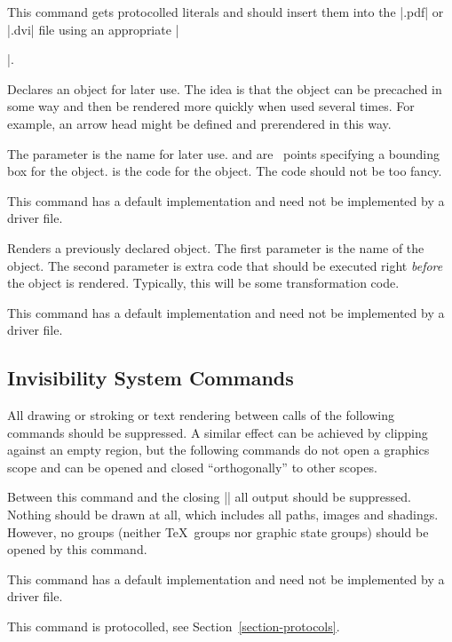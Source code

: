 \begin{command}{\pgfsys@invoke{}}
  This command gets protocolled literals and should insert them into
  the |.pdf| or |.dvi| file using an appropriate |\special|.
\end{command}

\begin{command}{\pgfsys@defobject{}}
  Declares an object for later use. The idea is that the object can be
  precached in some way and then be rendered more quickly when used
  several times. For example, an arrow head might be defined and
  prerendered in this way.

  The parameter  is the name for later use.  and  are \pgfname\ points specifying a bounding
  box for the object.  is the code for the object. The code
  should not be too fancy.

  This command has a default implementation and need not be
  implemented by a driver file.
\end{command}

\begin{command}{\pgfsys@useobject{}}
  Renders a previously declared object. The first parameter is the
  name of the object. The second parameter is extra code that
  should be executed right \emph{before} the object is
  rendered. Typically, this will be some transformation code.

  This command has a default implementation and need not be
  implemented by a driver file.
\end{command}


\subsection{Invisibility System Commands}

All drawing or stroking or text rendering between calls of the
following commands should be suppressed. A similar effect can be
achieved by clipping against an empty region, but the following
commands do not open a graphics scope and can be opened and closed
``orthogonally'' to other scopes.

\begin{command}{\pgfsys@begininvisible}
  Between this command and the closing |\pgfsys@endinvisible| all
  output should be suppressed. Nothing should be drawn at all, which
  includes all paths, images and shadings. However, no groups (neither
  \TeX\ groups nor graphic state groups) should be opened by this
  command.

  This command has a default implementation and need not be
  implemented by a driver file.

  This command is protocolled, see Section~\ref{section-protocols}.
\end{command}

